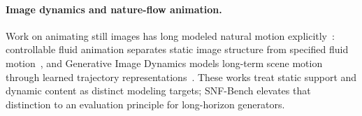 \paragraph{Image dynamics and nature-flow animation.}
Work on animating still images has long modeled natural motion explicitly~\cite{holynski2021animating,xing2024dynamicrafter,ma2025cinemo,lei2025animateanything,li2025wonderplay}: controllable fluid animation separates static image structure from specified fluid motion~\cite{mahapatra2022controllable}, and Generative Image Dynamics models long-term scene motion through learned trajectory representations~\cite{Li_2024_gen_image_dynamics}. These works treat static support and dynamic content as distinct modeling targets; SNF-Bench elevates that distinction to an evaluation principle for long-horizon generators.
